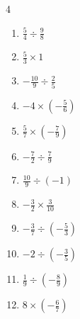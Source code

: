 \begin{multicols}{4}
\begin{enumerate}
  \item $\displaystyle \frac{5}{4}\div{}\frac{9}{8}$


  \item $\displaystyle \frac{5}{3}\times{}1$


  \item $\displaystyle -\frac{10}{9}\div{}\frac{2}{5}$


  \item $\displaystyle -4\times{}\left(-\frac{5}{6}\right)$


  \item $\displaystyle \frac{5}{7}\times{}\left(-\frac{7}{9}\right)$


\columnbreak %

  \item $\displaystyle -\frac{7}{2}\div{}\frac{7}{9}$


  \item $\displaystyle \frac{10}{9}\div{}\left(-1\right)$


  \item $\displaystyle -\frac{3}{2}\times{}\frac{3}{10}$


  \item $\displaystyle -\frac{3}{7}\div{}\left(-\frac{5}{3}\right)$


  \item $\displaystyle -2\div{}\left(-\frac{3}{5}\right)$


  \item $\displaystyle \frac{1}{9}\div{}\left(-\frac{8}{9}\right)$


  \item $\displaystyle 8\times{}\left(-\frac{6}{7}\right)$


\end{enumerate}
\end{multicols}
